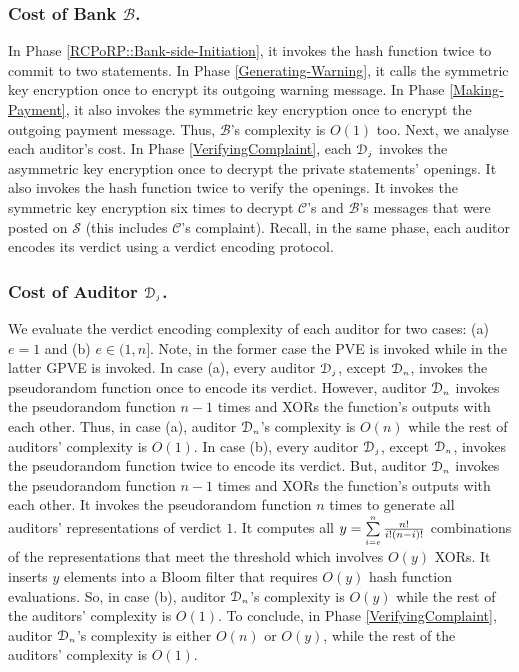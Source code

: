 \subsubsection{Cost of Bank $\mathcal{B}$.} 
%
 In Phase \ref{RCPoRP::Bank-side-Initiation}, it invokes the hash function twice to commit to two statements. In Phase \ref{Generating-Warning}, it calls the symmetric key encryption once to encrypt its outgoing warning message. In Phase \ref{Making-Payment}, it also invokes the symmetric key encryption once to encrypt the outgoing payment message. Thus, $\mathcal{B}$'s complexity is  $O(1)$ too. Next, we analyse each auditor's cost. In Phase \ref{VerifyingComplaint}, each $\mathcal{D}_{\scriptscriptstyle j}$ invokes the asymmetric key encryption once to decrypt the private statements' openings. It also invokes the hash function twice to verify the openings. It invokes the symmetric key encryption six times to decrypt $\mathcal{C}$'s and $\mathcal{B}$'s messages that were posted on $\mathcal{S}$ (this includes $\mathcal{C}$'s complaint). Recall, in the same phase, each auditor encodes its verdict using a verdict encoding protocol. 
\vspace{-1mm}
\subsubsection{Cost of  Auditor $\mathcal{D}_{\scriptscriptstyle j}$.} 
%
We evaluate the verdict encoding complexity of each auditor for two cases: (a)   $e=1$ and (b) $e\in(1, n]$. Note, in the former case the PVE is invoked while in the latter GPVE is invoked. In case (a), every auditor $\mathcal{D}_{\scriptscriptstyle j}$, except $\mathcal{D}_{\scriptscriptstyle n}$, invokes the pseudorandom function once to encode its verdict. However,  auditor $\mathcal{D}_{\scriptscriptstyle n}$ invokes the pseudorandom function $n-1$ times and XORs the function's outputs with each other. Thus, in  case (a), auditor $\mathcal{D}_{\scriptscriptstyle n}$'s complexity is $O(n)$ while the rest of auditors' complexity is $O(1)$.  In case (b), every auditor $\mathcal{D}_{\scriptscriptstyle j}$, except $\mathcal{D}_{\scriptscriptstyle n}$, invokes the pseudorandom function twice to encode its verdict.  But,  auditor $\mathcal{D}_{\scriptscriptstyle n}$ invokes the pseudorandom function $n-1$ times and XORs the function's outputs with each other. It invokes the pseudorandom function $n$ times to generate all auditors' representations of verdict $1$. It computes all $y=\sum\limits_{\scriptscriptstyle i=e}^{\scriptscriptstyle n}\frac{n!}{i!(n- i)!}$ combinations of the representations that meet the threshold which involves $O(y)$ XORs. It inserts $y$ elements into a Bloom filter that requires  $O(y)$ hash function evaluations. So, in case (b), auditor $\mathcal{D}_{\scriptscriptstyle n}$'s complexity is $O(y)$ while the rest of the auditors' complexity is $O(1)$. To conclude, in Phase \ref{VerifyingComplaint},  auditor $\mathcal{D}_{\scriptscriptstyle n}$'s complexity is either $O(n)$ or $O(y)$, while the rest of  the auditors' complexity is $O(1)$. 



